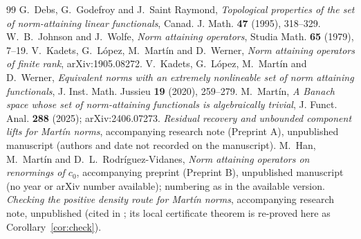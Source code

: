 \documentclass[10pt]{amsart}
\theoremstyle{definition}
\theoremstyle{remark}
\begin{document}
\begin{thebibliography}{99}
G.~Debs, G.~Godefroy and J.~Saint Raymond,
\emph{Topological properties of the set of norm-attaining linear
functionals}, Canad. J. Math. \textbf{47} (1995), 318--329.
W.~B.~Johnson and J.~Wolfe, \emph{Norm attaining operators},
Studia Math. \textbf{65} (1979), 7--19.
V.~Kadets, G.~L\'opez, M.~Mart\'in and D.~Werner,
\emph{Norm attaining operators of finite rank}, arXiv:1905.08272.
V.~Kadets, G.~L\'opez, M.~Mart\'in and D.~Werner,
\emph{Equivalent norms with an extremely nonlineable set of norm attaining
functionals}, J. Inst. Math. Jussieu \textbf{19} (2020), 259--279.
M.~Mart\'in,
\emph{A Banach space whose set of norm-attaining functionals is
algebraically trivial}, J. Funct. Anal. \textbf{288} (2025);
arXiv:2406.07273.
\emph{Residual recovery and unbounded component lifts for Mart\'in norms},
accompanying research note (Preprint A), unpublished manuscript (authors
and date not recorded on the manuscript).
M.~Han, M.~Mart\'in and D.~L.~Rodr\'iguez-Vidanes,
\emph{Norm attaining operators on renormings of $c_0$}, accompanying
preprint (Preprint B), unpublished manuscript (no year or arXiv number
available); numbering as in the available version.
\emph{Checking the positive density route for Mart\'in norms},
accompanying research note, unpublished (cited in \cite{PrA}; its local
certificate theorem is re-proved here as Corollary~\ref{cor:check}).
\end{thebibliography}
\end{document}
